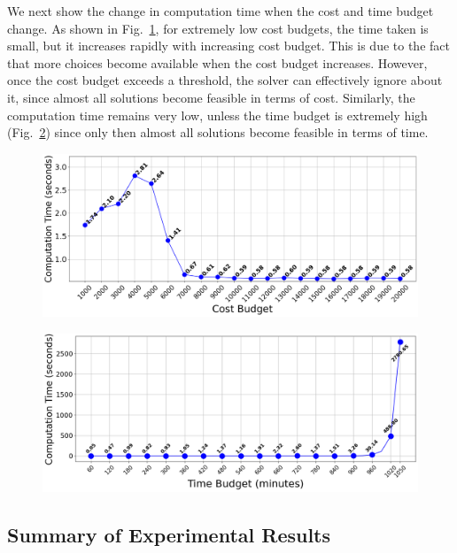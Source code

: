 We next show the change in computation time when the cost and time budget change.
As shown in Fig.~\ref{fig:cost-budget}, for extremely low cost budgets, the time taken is small, but it increases rapidly with increasing cost budget. This is due to the fact that more choices become available when the cost budget increases. However, once the cost budget exceeds a threshold, the solver can effectively ignore about it, since almost all solutions become feasible in terms of cost.
Similarly, the computation time remains very low, unless the time budget is extremely high (Fig.~\ref{fig:time-budget}) since only then almost all solutions become feasible in terms of time.

\begin{figure}[t]
    \centering
    \includegraphics[width=\figwidth]{plots/costbudgetvstoc.png}
    \label{fig:cost-budget}
\end{figure}

\begin{figure}[t]
    \centering
    \includegraphics[width=\figwidth]{plots/timebudgetvstoc.png}
    \label{fig:time-budget}
\end{figure}

\subsection{Summary of Experimental Results}

